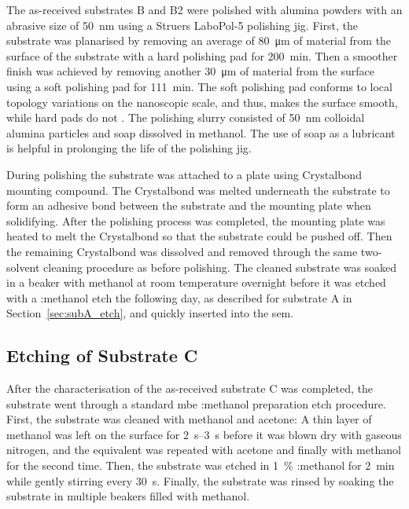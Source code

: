 The as-received substrates B and B2 were polished with alumina powders with an abrasive size of \SI{50}{\nano\metre} using a Struers LaboPol-5 polishing jig. First, the substrate was planarised by removing an average of \SI{80}{\micro\metre} of material from the surface of the substrate with a hard polishing pad for \SI{200}{\minute}. Then a smoother finish was achieved by removing another \SI{30}{\micro\metre} of material from the surface using a soft polishing pad for \SI{111}{\minute}. The soft polishing pad conforms to local topology variations on the nanoscopic scale, and thus, makes the surface smooth, while hard pads do not \citep{lee2000nanotopography}. The polishing slurry consisted of \SI{50}{\nano\metre} colloidal alumina particles and soap dissolved in methanol. The use of soap as a lubricant is helpful in prolonging the life of the polishing jig.

During polishing the substrate was attached to a plate using Crystalbond mounting compound. The Crystalbond was melted underneath the substrate to form an adhesive bond between the substrate and the mounting plate when solidifying. After the polishing process was completed, the mounting plate was heated to melt the Crystalbond so that the substrate could be pushed off. Then the remaining Crystalbond was dissolved and removed through the same two-solvent cleaning procedure as before polishing. The cleaned substrate was soaked in a beaker with methanol at room temperature overnight before it was etched with a :methanol etch the following day, as described for substrate A in Section~\ref{sec:subA_etch}, and quickly inserted into the \ac{sem}.

\subsection{Etching of Substrate C}

After the characterisation of the as-received substrate C was completed, the substrate went through a standard \ac{mbe} :methanol preparation etch procedure. First, the substrate was cleaned with methanol and acetone: A thin layer of methanol was left on the surface for \SIrange{2}{3}{\second} before it was blown dry with gaseous nitrogen, and the equivalent was repeated with acetone and finally with methanol for the second time. Then, the substrate was etched in \SI{1}{\percent} :methanol for \SI{2}{\minute} while gently stirring every \SI{30}{\second}. Finally, the substrate was rinsed by soaking the substrate in multiple beakers filled with methanol.

